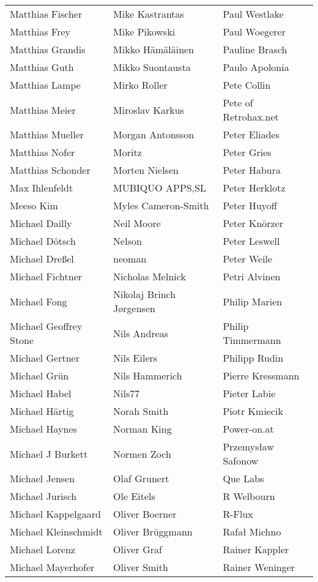 \begin{small}
\begin{tabular}{p{4cm}p{4cm}p{4cm}}
Matthias Fischer & Mike Kastrantas & Paul Westlake \\
Matthias Frey & Mike Pikowski & Paul Woegerer \\
Matthias Grandis & Mikko Hämäläinen & Pauline Brasch \\
Matthias Guth & Mikko Suontausta & Paulo Apolonia \\
Matthias Lampe & Mirko Roller & Pete Collin \\
Matthias Meier & Miroslav Karkus & Pete of Retrohax.net \\
Matthias Mueller & Morgan Antonsson & Peter Eliades \\
Matthias Nofer & Moritz & Peter Gries \\
Matthias Schonder & Morten Nielsen & Peter Habura \\
Max Ihlenfeldt & MUBIQUO APPS,SL & Peter Herklotz \\
Meeso Kim & Myles Cameron-Smith & Peter Huyoff \\
Michael Dailly & Neil Moore & Peter Knörzer \\
Michael Dötsch & Nelson & Peter Leswell \\
Michael Dreßel & neoman & Peter Weile \\
Michael Fichtner & Nicholas Melnick & Petri Alvinen \\
Michael Fong & Nikolaj Brinch Jørgensen & Philip Marien \\
Michael Geoffrey Stone & Nils Andreas & Philip Timmermann \\
Michael Gertner & Nils Eilers & Philipp Rudin \\
Michael Grün & Nils Hammerich & Pierre Kressmann \\
Michael Habel & Nils77 & Pieter Labie \\
Michael Härtig & Norah Smith & Piotr Kmiecik \\
Michael Haynes & Norman King & Power-on.at \\
Michael J Burkett & Normen Zoch & Przemysław Safonow \\
Michael Jensen & Olaf Grunert & Que Labs \\
Michael Jurisch & Ole Eitels & R Welbourn \\
Michael Kappelgaard & Oliver Boerner & R-Flux \\
Michael Kleinschmidt & Oliver Brüggmann & Rafał Michno \\
Michael Lorenz & Oliver Graf & Rainer Kappler \\
Michael Mayerhofer & Oliver Smith & Rainer Weninger \\

\end{tabular}
\end{small}
